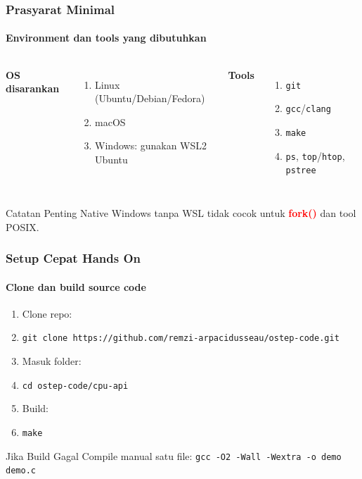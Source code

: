 \documentclass[t,aspectratio=169,xcolor=dvipsnames]{beamer}
\newcommand{\tem}[1]{\textbf{\textcolor{red}{#1}}}
\begin{document}
\begin{frame}
    \frametitle{Prasyarat Minimal}
    \framesubtitle{Environment dan tools yang dibutuhkan}
    \small
    \begin{columns}[T]
        \textbf{OS disarankan}
        \begin{enumerate}
            \item Linux (Ubuntu/Debian/Fedora)
            \item macOS
            \item Windows: gunakan WSL2 Ubuntu
        \end{enumerate}
        \textbf{Tools}
        \begin{enumerate}
            \item \texttt{git}
            \item \texttt{gcc}/\texttt{clang}
            \item \texttt{make}
            \item \texttt{ps}, \texttt{top}/\texttt{htop}, \texttt{pstree}
        \end{enumerate}
    \end{columns}
    \begin{alertblock}{Catatan Penting}
        Native Windows tanpa WSL tidak cocok untuk \tem{fork()} dan tool POSIX.
    \end{alertblock}
\end{frame}

\begin{frame}
    \frametitle{Setup Cepat Hands On}
    \framesubtitle{Clone dan build source code}
    \small
    \begin{enumerate}
        \item Clone repo:
        \item \texttt{git clone https://github.com/remzi-arpacidusseau/ostep-code.git}
        \item Masuk folder:
        \item \texttt{cd ostep-code/cpu-api}
        \item Build:
        \item \texttt{make}
    \end{enumerate}
    \begin{exampleblock}{Jika Build Gagal}
        Compile manual satu file: \texttt{gcc -O2 -Wall -Wextra -o demo demo.c}
    \end{exampleblock}
\end{frame}
\end{document}
